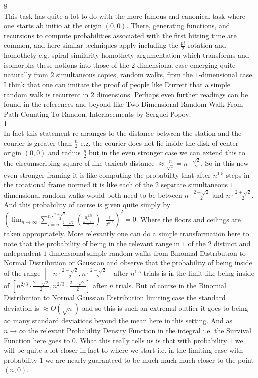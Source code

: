 
8 \\
This task has quite a lot to do with the more famous and canonical task where one starts ab initio at the origin $(0,0)$. There, generating functions, and recursions to compute probabilities associated with the first hitting time are common, and here similar techniques apply including the $\frac{pi}{2}$ rotation and homothety e.g. spiral similarity homothety argumentation which transforms and isomorphs these notions into those of the $2$-dimensional case emerging quite naturally from $2$ simultaneous copies, random walks, from the $1$-dimensional case. I think that one can imitate the proof of people like Durrett that a simple random walk is recurrent in $2$ dimensions. Perhaps even further readings can be found in the references and beyond like Two-Dimensional Random Walk From Path Counting To Random Interlacements by Serguei Popov. \\
1 \\
In fact this statement re arranges to the distance between the station and the courier is greater than $\frac{n}{2}$ e.g. the courier does not lie inside the disk of center origin $(0,0)$ and radius $\frac{n}{2}$ but in the even stronger case we can extend this to the circumscribing square of like taxicab distance $\approx \frac{n}{\sqrt{2}} = n \cdot \frac{\sqrt{2}}{2}$. So in this new even stronger framing it is like computing the probability that after $n^{1.5}$ steps in the rotational frame normed it is like each of the $2$ separate simultaneous $1$ dimensional random walks would both need to be between $n \cdot \frac{2-\sqrt{2}}{2}$ and $n \cdot \frac{2+\sqrt{2}}{2}$. And this probability of course is given quite simply by $\left( \lim_{n \to \infty} \sum_{i=n \cdot \frac{2-\sqrt{2}}{2}}^{n \cdot \frac{2+\sqrt{2}}{2}} \binom{n^{1.5}}{\frac{n^{1.5}+i}{2}} \cdot \frac{1}{2^{n^{1.5}}} \right)^2 = 0$. Where the floors and ceilings are taken appropriately. More relevantly one can do a simple transformation here to note that the probability of being in the relevant range in $1$ of the $2$ distinct and independent $1$-dimensional simple random walks from Binomial Distribution to Normal Distribution or Gaussian and observe that the probability of being inside of the range $\left[ -n \cdot \frac{2-\sqrt{2}}{2},n \cdot \frac{2-\sqrt{2}}{2} \right]$ after $n^{1.5}$ trials is in the limit like being inside of $\left[ n^{2/3} \cdot \frac{2-\sqrt{2}}{2},n^{2/3} \cdot \frac{2-\sqrt{2}}{2} \right]$ after $n$ trials. But of course in the Binomial Distribution to Normal Gaussian Distribution limiting case the standard deviation is $\approx O(\sqrt{n})$ and so this is such an extremal outlier it goes to being $\infty$ many standard deviations beyond the mean here in this setting. And as $n \to \infty$ the relevant Probability Density Function in the integral i.e. the Survival Function here goes to $0$. What this really tells us is that with probability $1$ we will be quite a lot closer in fact to where we start i.e. in the limiting case with probability $1$ we are nearly guaranteed to be much much much closer to the point $(n,0)$.

